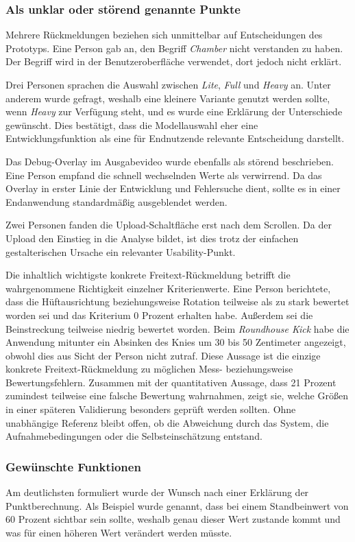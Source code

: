 \documentclass[intern]{cgMA}
\begin{document}
\subsubsection{Als unklar oder störend genannte Punkte}
Mehrere Rückmeldungen beziehen sich unmittelbar auf Entscheidungen des Prototyps. Eine Person gab an, den Begriff \textit{Chamber} nicht verstanden zu haben. Der Begriff wird in der Benutzeroberfläche verwendet, dort jedoch nicht erklärt.

Drei Personen sprachen die Auswahl zwischen \textit{Lite}, \textit{Full} und \textit{Heavy} an. Unter anderem wurde gefragt, weshalb eine kleinere Variante genutzt werden sollte, wenn \textit{Heavy} zur Verfügung steht, und es wurde eine Erklärung der Unterschiede gewünscht. Dies bestätigt, dass die Modellauswahl eher eine Entwicklungsfunktion als eine für Endnutzende relevante Entscheidung darstellt.

Das Debug-Overlay im Ausgabevideo wurde ebenfalls als störend beschrieben. Eine Person empfand die schnell wechselnden Werte als verwirrend. Da das Overlay in erster Linie der Entwicklung und Fehlersuche dient, sollte es in einer Endanwendung standardmäßig ausgeblendet werden.

Zwei Personen fanden die Upload-Schaltfläche erst nach dem Scrollen. Da der Upload den Einstieg in die Analyse bildet, ist dies trotz der einfachen gestalterischen Ursache ein relevanter Usability-Punkt.

Die inhaltlich wichtigste konkrete Freitext-Rückmeldung betrifft die wahrgenommene Richtigkeit einzelner Kriterienwerte. Eine Person berichtete, dass die Hüftausrichtung beziehungsweise Rotation teilweise als zu stark bewertet worden sei und das Kriterium 0 Prozent erhalten habe. Außerdem sei die Beinstreckung teilweise niedrig bewertet worden. Beim \textit{Roundhouse Kick} habe die Anwendung mitunter ein Absinken des Knies um 30 bis 50 Zentimeter angezeigt, obwohl dies aus Sicht der Person nicht zutraf. Diese Aussage ist die einzige konkrete Freitext-Rückmeldung zu möglichen Mess- beziehungsweise Bewertungsfehlern. Zusammen mit der quantitativen Aussage, dass 21 Prozent zumindest teilweise eine falsche Bewertung wahrnahmen, zeigt sie, welche Größen in einer späteren Validierung besonders geprüft werden sollten. Ohne unabhängige Referenz bleibt offen, ob die Abweichung durch das System, die Aufnahmebedingungen oder die Selbsteinschätzung entstand.

\subsubsection{Gewünschte Funktionen}
Am deutlichsten formuliert wurde der Wunsch nach einer Erklärung der Punktberechnung. Als Beispiel wurde genannt, dass bei einem Standbeinwert von 60 Prozent sichtbar sein sollte, weshalb genau dieser Wert zustande kommt und was für einen höheren Wert verändert werden müsste.
\end{document}
